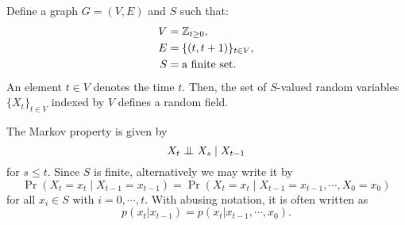 \documentclass{../exp}
\begin{document}
\begin{ex}
Define a graph $G=(V,E)$ and $S$ such that:
\begin{align*}
V&=\mathbb{Z}_{t\ge0},\\
E&=\{(t,t+1)\}_{t\in V},\\
S&=\text{a finite set}.
\end{align*}
An element $t\in V$ denotes the time $t$.
Then, the set of $S$-valued random variables $\{X_t\}_{t\in V}$ indexed by $V$ defines a random field.

The Markov property is given by
\[X_t\mathrel{\perp\mspace{-10mu}\perp} X_s\mid X_{t-1}\]
for $s\le t$.
Since $S$ is finite, alternatively we may write it by
\[\Pr(X_t=x_t\mid X_{t-1}=x_{t-1})=\Pr(X_t=x_t\mid X_{t-1}=x_{t-1},\cdots,X_0=x_0)\]
for all $x_i\in S$ with $i=0,\cdots,t$.
With abusing notation, it is often written as
\[p(x_t|x_{t-1})=p(x_t|x_{t-1},\cdots,x_0).\]
\end{ex}
\end{document}

